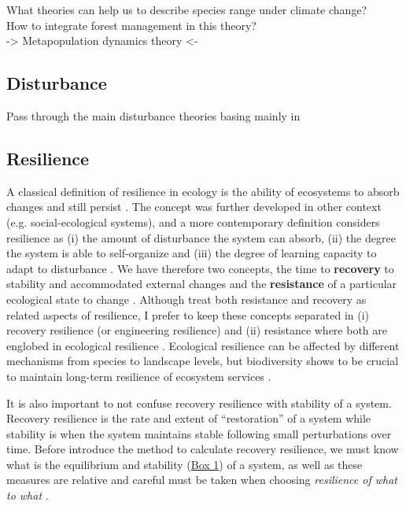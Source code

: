 What theories can help us to describe species range under climate change?\\
How to integrate forest management in this theory?\\
-> Metapopulation dynamics theory <-

\subsection{Disturbance}
Pass through the main disturbance theories basing mainly in \citet{Pulsford2016}

\subsection{Resilience}\label{res}

A classical definition of resilience in ecology is the ability of ecosystems to absorb changes and still persist \citep{Holling1973}.
The concept was further developed in other context (e.g. social-ecological systems), and a more contemporary definition considers resilience as (i) the amount of disturbance the system can absorb, (ii) the degree the system is able to self-organize and (iii) the degree of learning capacity to adapt to disturbance \citep{Cumming2011}.
We have therefore two concepts, the time to \textbf{recovery} to stability and accommodated external changes \citep{pimm1984,Folke2002} and the \textbf{resistance} of a particular ecological state to change \citep{Peterson1998}.
Although \citet{Oliver2015} treat both resistance and recovery as related aspects of resilience, I prefer to keep these concepts separated in (i) recovery resilience (or engineering resilience) and (ii) resistance where both are englobed in ecological resilience \citep{Hodgson2015,Nimmo2015}.
Ecological resilience can be affected by different mechanisms from species to landscape levels, but biodiversity shows to be crucial to maintain long-term resilience of ecosystem services \citep{Oliver2015}.

It is also important to not confuse recovery resilience with stability of a system.
Recovery resilience is the rate and extent of ``restoration'' of a system while stability is when the system maintains stable following small perturbations over time.
Before introduce the method to calculate recovery resilience, we must know what is the equilibrium and stability (\hyperlink{box1}{Box 1}) of a system, as well as these measures are relative and careful must be taken when choosing \textit{resilience of what to what} \citep{Carpenter2001}.

